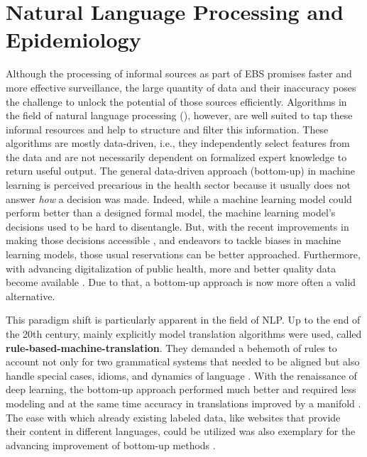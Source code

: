 \section{Natural Language Processing and Epidemiology}
  Although the processing of informal sources as part of EBS promises faster and more effective surveillance, the large quantity of data and their inaccuracy poses the challenge to unlock the potential of those sources efficiently.
  Algorithms in the field of natural language processing (), however, are well suited to tap these informal resources and help to structure and filter this information.
  These algorithms are mostly data-driven, i.e., they independently select features from the data and are not necessarily dependent on formalized expert knowledge to return useful output.
  The general data-driven approach (bottom-up) in machine learning is perceived precarious in the health sector because it usually does not answer \emph{how} a decision was made.
  Indeed, while a machine learning model could perform better than a designed formal model, the machine learning model's decisions used to be hard to disentangle.
  But, with the recent improvements in making those decisions accessible \citep{Arras2017}, and endeavors to tackle biases in machine learning models, those usual reservations can be better approached.
  Furthermore, with advancing digitalization of public health, more and better quality data become available \citep{DEMIS}.
  Due to that, a bottom-up approach is now more often a valid alternative.

  This paradigm shift is particularly apparent in the field of NLP.
  Up to the end of the 20th century, mainly explicitly model translation algorithms were used, called \textbf{rule-based-machine-translation}.
  They demanded a behemoth of rules to account not only for two grammatical systems that needed to be aligned but also handle special cases, idioms, and dynamics of language \citep{Bar-Hillel1953, Bar-Hillel1960}.
  With the renaissance of deep learning, the bottom-up approach performed much better and required less modeling and at the same time accuracy in translations improved by a manifold \citep{Bengio2003}.
  The ease with which already existing labeled data, like websites that provide their content in different languages, could be utilized was also exemplary for the advancing improvement of bottom-up methods \citep{Macklovitch00}.

